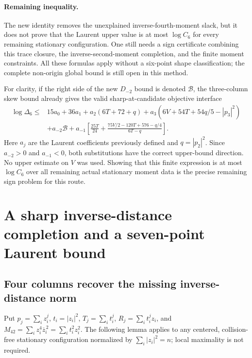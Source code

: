 \documentclass[11pt]{article}
\theoremstyle{remark}
\numberwithin{equation}{section}
\begin{document}
\paragraph{Remaining inequality.}
The new identity removes the unexplained inverse-fourth-moment
slack, but it does not prove that the Laurent upper value is at most
$\log C_6$ for every remaining stationary configuration. One still
needs a sign certificate combining this trace closure, the
inverse-second-moment completion, and the finite moment constraints.
All these formulas apply without a six-point shape classification;
the complete non-origin global bound is still open in this method.

For clarity, if the right side of the new $D_{-2}$ bound is denoted
$\mathcal B$, the three-column skew bound already gives the valid
sharp-at-candidate objective interface
\begin{align*}
 \log\Delta_6\le{}&15a_0+36a_1
  +a_2(6T+72+q)
  +a_3(6V+54T+54q/5-|p_3|^2)\\
 &+a_{-2}\mathcal B
  +a_{-1}\left[\frac{25T}{24}
    +\frac{75V/2-120T+576-q/4}{6T-q}\right].
\end{align*}
Here $a_j$ are the Laurent coefficients previously defined and
$q=|p_2|^2$. Since $a_{-2}>0$ and $a_{-1}<0$, both substitutions
have the correct upper-bound direction. No upper estimate on $V$
was used. Showing that this finite expression is at most $\log C_6$
over all remaining actual stationary moment data is the precise
remaining sign problem for this route.

\section{A sharp inverse-distance completion and a seven-point Laurent bound}
\label{sec:noorigin-oct8-seven}

\subsection{Four columns recover the missing inverse-distance norm}

Put $p_j=\sum_i z_i^j$, $t_i=|z_i|^2$, $T_j=\sum_i t_i^j$,
$R_j=\sum_i t_i^jz_i$, and
$M_{42}=\sum_i z_i^4\overline z_i^{\,2}=\sum_i t_i^2z_i^2$.
The following lemma applies to any centered, collision-free stationary
configuration normalized by $\sum_i|z_i|^2=n$; local maximality is
not required.
\end{document}
